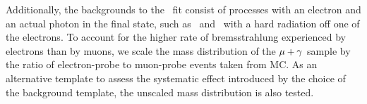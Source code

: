 Additionally, the backgrounds to the \Pe\Pgg\ fit consist of processes with an electron and an actual photon in the final state, such as \PW\Pgg\ and \Zee\ with a hard radiation off one of the electrons.
To account for the higher rate of bremsstrahlung experienced by electrons than by muons, we scale the mass distribution of the ${\mu}+\gamma$ sample by the ratio of electron-probe to muon-probe events taken from MC.
As an alternative template to assess the systematic effect introduced by the choice of the background template, the unscaled mass distribution is also tested.

\begin{figure}[htbp]
  \centering
\end{figure}
